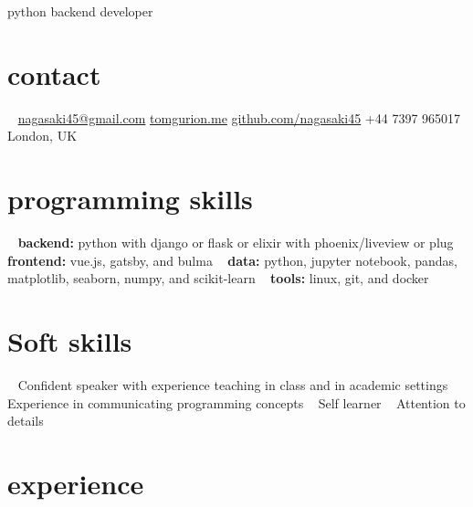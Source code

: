 \documentclass[]{friggeri-cv}
\begin{document}
       {python backend developer}



\begin{aside}
\section{contact}
~
\href{mailto:nagasaki45@gmail.com}{nagasaki45@gmail.com}
\href{http://tomgurion.me}{tomgurion.me}
\href{https://github.com/nagasaki45}{github.com/nagasaki45}
+44 7397 965017
London, UK
~
\section{programming skills}
~
\textbf{backend:} python with django or flask or elixir with phoenix/liveview or plug
~
\textbf{frontend:} vue.js, gatsby, and bulma
~
\textbf{data:} python, jupyter notebook, pandas, matplotlib, seaborn, numpy, and scikit-learn
~
\textbf{tools:} linux, git, and docker
~
\section{Soft skills}
~
Confident speaker with experience teaching in class and in academic settings
~
Experience in communicating programming concepts
~
Self learner
~
Attention to details
\end{aside}



\section{experience}
\end{document}
